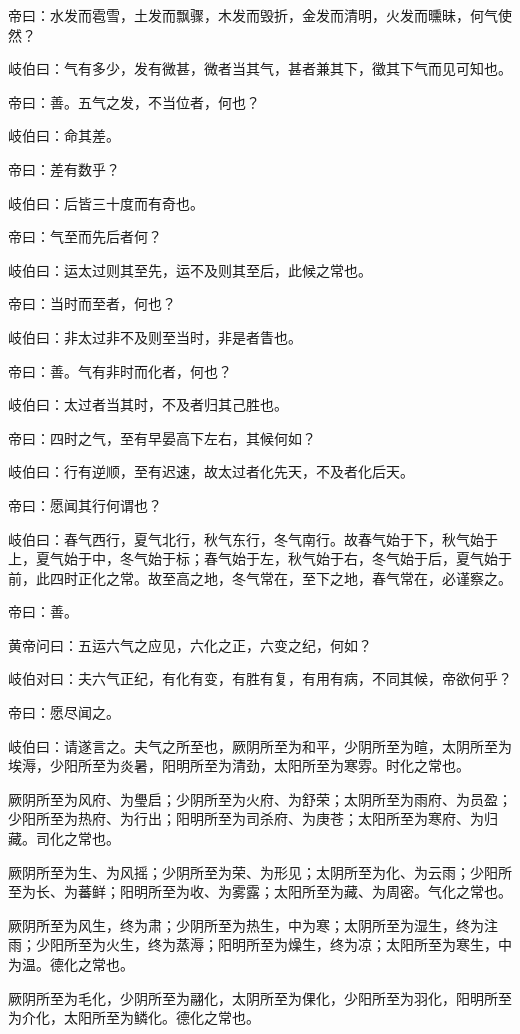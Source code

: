 \documentclass{article}%
\begin{document}
帝曰：水发而雹雪，土发而飘骤，木发而毁折，金发而清明，火发而曛昧，何气使然？

岐伯曰：气有多少，发有微甚，微者当其气，甚者兼其下，徵其下气而见可知也。

帝曰：善。五气之发，不当位者，何也？

岐伯曰：命其差。

帝曰：差有数乎？

岐伯曰：后皆三十度而有奇也。

帝曰：气至而先后者何？

岐伯曰：运太过则其至先，运不及则其至后，此候之常也。

帝曰：当时而至者，何也？

岐伯曰：非太过非不及则至当时，非是者眚也。

帝曰：善。气有非时而化者，何也？

岐伯曰：太过者当其时，不及者归其己胜也。

帝曰：四时之气，至有早晏高下左右，其候何如？

岐伯曰：行有逆顺，至有迟速，故太过者化先天，不及者化后天。

帝曰：愿闻其行何谓也？

岐伯曰：春气西行，夏气北行，秋气东行，冬气南行。故春气始于下，秋气始于上，夏气始于中，冬气始于标；春气始于左，秋气始于右，冬气始于后，夏气始于前，此四时正化之常。故至高之地，冬气常在，至下之地，春气常在，必谨察之。

帝曰：善。

黄帝问曰：五运六气之应见，六化之正，六变之纪，何如？

岐伯对曰：夫六气正纪，有化有变，有胜有复，有用有病，不同其候，帝欲何乎？

帝曰：愿尽闻之。

岐伯曰：请遂言之。夫气之所至也，厥阴所至为和平，少阴所至为暄，太阴所至为埃溽，少阳所至为炎暑，阳明所至为清劲，太阳所至为寒雰。时化之常也。

厥阴所至为风府、为璺启；少阴所至为火府、为舒荣；太阴所至为雨府、为员盈；少阳所至为热府、为行出；阳明所至为司杀府、为庚苍；太阳所至为寒府、为归藏。司化之常也。

厥阴所至为生、为风摇；少阴所至为荣、为形见；太阴所至为化、为云雨；少阳所至为长、为蕃鲜；阳明所至为收、为雾露；太阳所至为藏、为周密。气化之常也。

厥阴所至为风生，终为肃；少阴所至为热生，中为寒；太阴所至为湿生，终为注雨；少阳所至为火生，终为蒸溽；阳明所至为燥生，终为凉；太阳所至为寒生，中为温。德化之常也。

厥阴所至为毛化，少阴所至为翮化，太阴所至为倮化，少阳所至为羽化，阳明所至为介化，太阳所至为鳞化。德化之常也。
\end{document}
